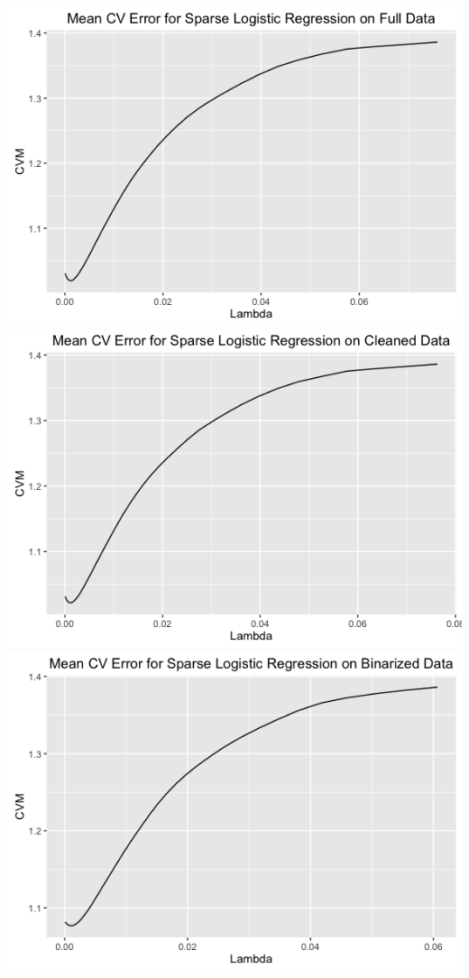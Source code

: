 \documentclass{article}
\begin{document}
\centerline{\includegraphics[scale=.25]{diagrams/1logreg.png}\includegraphics[scale=.25]{diagrams/2logreg.png}\includegraphics[scale=.25]{diagrams/3logreg.png}}
\end{document}
